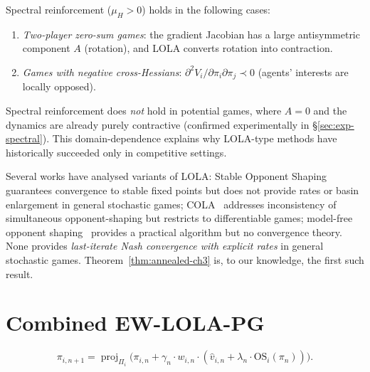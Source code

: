 \begin{proposition}
\label{prop:sufficient-ch3}
Spectral reinforcement ($\mu_H > 0$) holds in the following cases:
\begin{enumerate}[label=(\alph*)]
    \item \emph{Two-player zero-sum games}: the gradient Jacobian has a large antisymmetric component $A$ (rotation), and LOLA converts rotation into contraction.
    \item \emph{Games with negative cross-Hessians}: $\partial^2 V_i / \partial \pi_i \partial \pi_j \prec 0$ (agents' interests are locally opposed).
\end{enumerate}
Spectral reinforcement does \emph{not} hold in potential games, where $A = 0$ and the dynamics are already purely contractive (confirmed experimentally in \S\ref{sec:exp-spectral}). This domain-dependence explains why LOLA-type methods have historically succeeded only in competitive settings.
\end{proposition}

\begin{remark}
\label{rem:lola-comparison}
Several works have analysed variants of LOLA: Stable Opponent Shaping~\cite{letcher2019} guarantees convergence to stable fixed points but does not provide rates or basin enlargement in general stochastic games; COLA~\cite{willi2022cola} addresses inconsistency of simultaneous opponent-shaping but restricts to differentiable games; model-free opponent shaping~\cite{lu2022model} provides a practical algorithm but no convergence theory. None provides \emph{last-iterate Nash convergence with explicit rates} in general stochastic games. Theorem~\ref{thm:annealed-ch3} is, to our knowledge, the first such result.
\end{remark}


\section{Combined EW-LOLA-PG}
\label{sec:combined}

\begin{equation}
\tag{EW-LOLA-PG}
    \pi_{i,n+1} = \operatorname{proj}_{\Pi_i}\bigl(\pi_{i,n} + \gamma_n \cdot w_{i,n} \cdot (\hat{v}_{i,n} + \lambda_n \cdot \mathrm{OS}_i(\pi_n))\bigr).
\end{equation}

